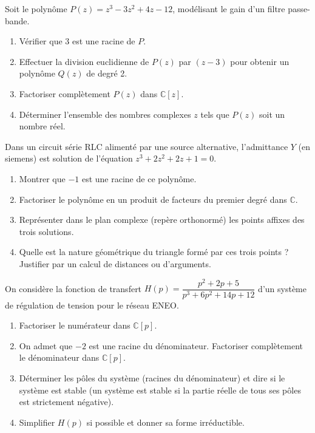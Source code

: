 \documentclass[11pt]{article}
\begin{document}
\begin{exercice}
Soit le polynôme $P(z) = z^3 - 3z^2 + 4z - 12$, modélisant le gain d'un filtre passe-bande.
\begin{enumerate}
    \item Vérifier que $3$ est une racine de $P$.
    \item Effectuer la division euclidienne de $P(z)$ par $(z - 3)$ pour obtenir un polynôme $Q(z)$ de degré 2.
    \item Factoriser complètement $P(z)$ dans $\mathbb{C}[z]$.
    \item Déterminer l'ensemble des nombres complexes $z$ tels que $P(z)$ soit un nombre réel.
\end{enumerate}
\end{exercice}

\begin{exercice}
Dans un circuit série RLC alimenté par une source alternative, l'admittance $Y$ (en siemens) est solution de l'équation $z^3 + 2z^2 + 2z + 1 = 0$.
\begin{enumerate}
    \item Montrer que $-1$ est une racine de ce polynôme.
    \item Factoriser le polynôme en un produit de facteurs du premier degré dans $\mathbb{C}$.
    \item Représenter dans le plan complexe (repère orthonormé) les points affixes des trois solutions.
    \item Quelle est la nature géométrique du triangle formé par ces trois points ? Justifier par un calcul de distances ou d'arguments.
\end{enumerate}
\end{exercice}

\begin{exercice}
On considère la fonction de transfert $H(p) = \dfrac{p^2 + 2p + 5}{p^3 + 6p^2 + 14p + 12}$ d'un système de régulation de tension pour le réseau ENEO.
\begin{enumerate}
    \item Factoriser le numérateur dans $\mathbb{C}[p]$.
    \item On admet que $-2$ est une racine du dénominateur. Factoriser complètement le dénominateur dans $\mathbb{C}[p]$.
    \item Déterminer les pôles du système (racines du dénominateur) et dire si le système est stable (un système est stable si la partie réelle de tous ses pôles est strictement négative).
    \item Simplifier $H(p)$ si possible et donner sa forme irréductible.
\end{enumerate}
\end{exercice}
\end{document}
